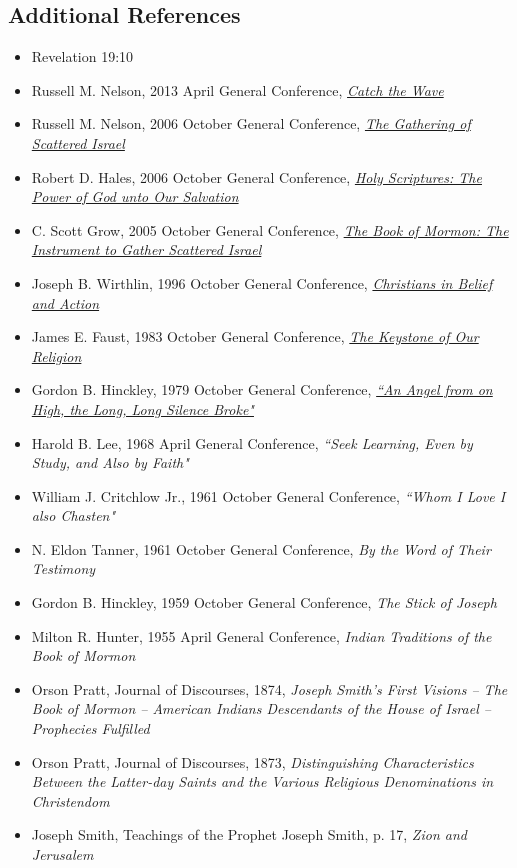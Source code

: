 \documentclass[12pt]{report}
\begin{document}
\subsection{Additional References\label{titlePage:references2}}
\begin{itemize}
\item Revelation 19:10
\item Russell M. Nelson, 2013 April General Conference, \href{https://www.lds.org/general-conference/2013/04/catch-the-wave?lang=eng}{\emph{Catch the Wave}}
\item Russell M. Nelson, 2006 October General Conference, \href{https://www.lds.org/general-conference/2006/10/the-gathering-of-scattered-israel?lang=eng}{\emph{The Gathering of Scattered Israel}}
\item Robert D. Hales, 2006 October General Conference, \href{https://www.lds.org/general-conference/2006/10/holy-scriptures-the-power-of-god-unto-our-salvation?lang=eng}{\emph{Holy Scriptures: The Power of God unto Our Salvation}}
\item C. Scott Grow, 2005 October General Conference, \href{https://www.lds.org/general-conference/2005/10/the-book-of-mormon-the-instrument-to-gather-scattered-israel?lang=eng}{\emph{The Book of Mormon: The Instrument to Gather Scattered Israel}}
\item Joseph B. Wirthlin, 1996 October General Conference, \href{https://www.lds.org/general-conference/1996/10/christians-in-belief-and-action?lang=eng}{\emph{Christians in Belief and Action}}
\item James E. Faust, 1983 October General Conference, \href{https://www.lds.org/general-conference/1983/10/the-keystone-of-our-religion?lang=eng}{\emph{The Keystone of Our Religion}}
\item Gordon B. Hinckley, 1979 October General Conference, \href{https://www.lds.org/general-conference/1979/10/an-angel-from-on-high-the-long-long-silence-broke?lang=eng}{\emph{``An Angel from on High, the Long, Long Silence Broke"}}
\item Harold B. Lee, 1968 April General Conference, \emph{``Seek Learning, Even by Study, and Also by Faith"}
\item William J. Critchlow Jr., 1961 October General Conference, \emph{``Whom I Love I also Chasten"}
\item N. Eldon Tanner, 1961 October General Conference, \emph{By the Word of Their Testimony}
\item Gordon B. Hinckley, 1959 October General Conference, \emph{The Stick of Joseph}
\item Milton R. Hunter, 1955 April General Conference, \emph{Indian Traditions of the Book of Mormon}
\item Orson Pratt, Journal of Discourses, 1874, \emph{Joseph Smith's First Visions -- The Book of Mormon -- American Indians Descendants of the House of Israel -- Prophecies Fulfilled}
\item Orson Pratt, Journal of Discourses, 1873, \emph{Distinguishing Characteristics Between the Latter-day Saints and the Various Religious Denominations in Christendom}
\item Joseph Smith, Teachings of the Prophet Joseph Smith, p. 17, \emph{Zion and Jerusalem}
\end{itemize}
\end{document}
